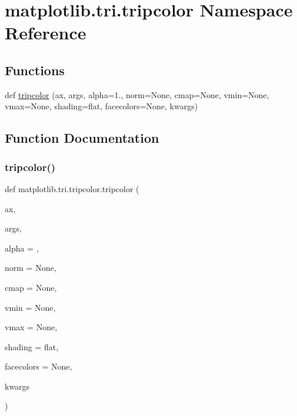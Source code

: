 \hypertarget{namespacematplotlib_1_1tri_1_1tripcolor}{}\section{matplotlib.\+tri.\+tripcolor Namespace Reference}
\label{namespacematplotlib_1_1tri_1_1tripcolor}
\subsection*{Functions}
\begin{DoxyCompactItemize}
\item 
def \hyperlink{namespacematplotlib_1_1tri_1_1tripcolor_af9fe99bd1f8bfd84aacb48ef1c98a5a3}{tripcolor} (ax, args, alpha=1., norm=None, cmap=None, vmin=None, vmax=None, shading=\textquotesingle{}flat\textquotesingle{}, facecolors=None, kwargs)
\end{DoxyCompactItemize}


\subsection{Function Documentation}
\mbox{\label{namespacematplotlib_1_1tri_1_1tripcolor_af9fe99bd1f8bfd84aacb48ef1c98a5a3}} 
\subsubsection{\texorpdfstring{tripcolor()}{tripcolor()}}
{\footnotesize\ttfamily def matplotlib.\+tri.\+tripcolor.\+tripcolor (\begin{DoxyParamCaption}\item[{}]{ax,  }\item[{}]{args,  }\item[{}]{alpha = {},  }\item[{}]{norm = {\ttfamily None},  }\item[{}]{cmap = {\ttfamily None},  }\item[{}]{vmin = {\ttfamily None},  }\item[{}]{vmax = {\ttfamily None},  }\item[{}]{shading = {\ttfamily \textquotesingle{}flat\textquotesingle{}},  }\item[{}]{facecolors = {\ttfamily None},  }\item[{}]{kwargs }\end{DoxyParamCaption})}

